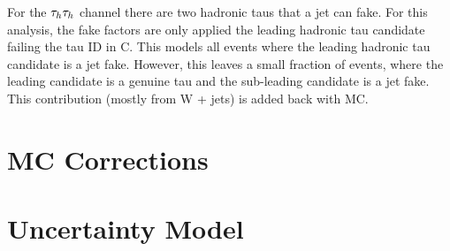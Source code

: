 For the $\tau_{h}\tau_{h}$ channel there are two hadronic taus that a jet can fake.
For this analysis, the fake factors are only applied the leading hadronic tau candidate failing the tau ID in C.
This models all events where the leading hadronic tau candidate is a jet fake.
However, this leaves a small fraction of events, where the leading candidate is a genuine tau and the sub-leading candidate is a jet fake.
This contribution (mostly from W + jets) is added back with MC.

\newpage
\section{MC Corrections}

\newpage
\section{Uncertainty Model}

